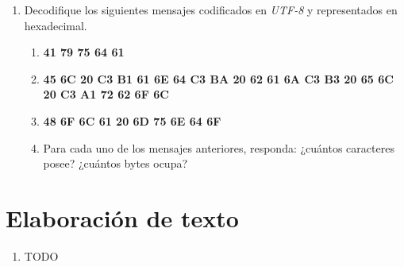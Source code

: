 \documentclass[12pt]{article}
\begin{document}
\begin{enumerate}

    \item Decodifique los siguientes mensajes codificados en \emph{UTF-8} y
        representados en hexadecimal.

        \begin{enumerate}

            \item \textbf{41 79 75 64 61}

            \item \textbf{45 6C 20 C3 B1 61 6E 64 C3 BA 20 62 61 6A C3 B3 20
                65 6C 20 C3 A1 72 62 6F 6C}

            \item \textbf{48 6F 6C 61 20 6D 75 6E 64 6F}

            \item Para cada uno de los mensajes anteriores, responda: ¿cuántos
                caracteres posee? ¿cuántos bytes ocupa?

        \end{enumerate}

\end{enumerate}

\section{Elaboración de texto}

\begin{enumerate}

    \item TODO

\end{enumerate}
\end{document}
